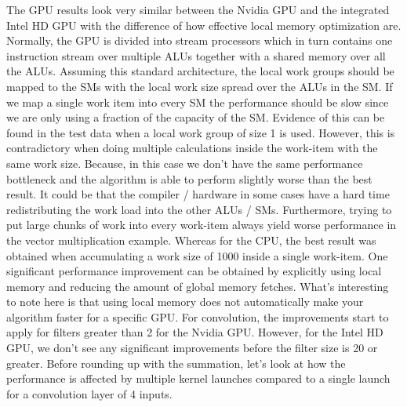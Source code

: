 \documentclass[a4paper,10pt]{article}
\theoremstyle{definition}
\begin{document}
The GPU results look very similar between the Nvidia GPU and the integrated Intel HD GPU with the difference of how effective local memory optimization are. Normally, the GPU is divided into stream processors which in turn contains one instruction stream over multiple ALUs together with a shared memory over all the ALUs. Assuming this standard architecture, the local work groups should be mapped to the SMs with the local work size spread over the ALUs in the SM. If we map a single work item into every SM the performance should be slow since we are only using a fraction of the capacity of the SM. Evidence of this can be found in the test data when a local work group of size 1 is used. However, this is contradictory when doing multiple calculations inside the work-item with the same work size. Because, in this case we don't have the same performance bottleneck and the algorithm is able to perform slightly worse than the best result. It could be that the compiler / hardware in some cases have a hard time redistributing the work load into the other ALUs / SMs. Furthermore, trying to put large chunks of work into every work-item always yield worse performance in the vector multiplication example. Whereas for the CPU, the best result was obtained when accumulating a work size of 1000 inside a single work-item. One significant performance improvement can be obtained by explicitly using local memory and reducing the amount of global memory fetches. What's interesting to note here is that using local memory does not automatically make your algorithm faster for a specific GPU. For convolution, the improvements start to apply for filters greater than 2 for the Nvidia GPU. However, for the Intel HD GPU, we don't see any significant improvements before the filter size is 20 or greater. Before rounding up with the summation, let's look at how the performance is affected by multiple kernel launches compared to a single launch for a convolution layer of 4 inputs.       
\end{document}
